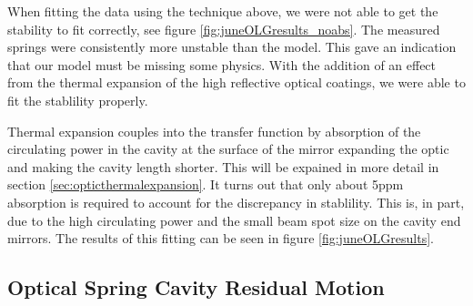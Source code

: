 When fitting the data using the technique above, we were not able to get the
stability to fit correctly, see figure \ref{fig:juneOLGresults_noabs}.
The measured springs were consistently more unstable than the model.
This gave an indication that our model must be missing some physics.
With the addition of an effect from the thermal expansion of the high
reflective optical coatings, we were able to fit the stablility
properly.

Thermal expansion couples into the transfer function by absorption of the
circulating power in the cavity at the surface of the mirror expanding the
optic and making the cavity length shorter.
This will be expained in more detail in section
\ref{sec:opticthermalexpansion}.
It turns out that only about 5ppm absorption is required to account for the
discrepancy in stablility.
This is, in part, due to the high circulating power and the small
beam spot size on the cavity end mirrors.
The results of this fitting can be seen in figure \ref{fig:juneOLGresults}.

\subsection{Optical Spring Cavity Residual Motion}

